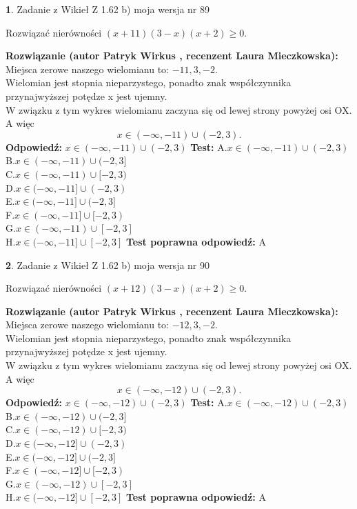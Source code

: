 \documentclass[12pt, a4paper]{article}
\theoremstyle{definition} %
\newtheorem{zad}{}
\newcommand{\zadStart}[1]{\begin{zad}#1\newline}
\newcommand{\zadStop}{\end{zad}}
\newcommand{\rozwStart}[2]{\noindent \textbf{Rozwiązanie (autor #1 , recenzent #2): }\newline}
\newcommand{\rozwStop}{\newline}
\newcommand{\odpStart}{\noindent \textbf{Odpowiedź:}\newline}
\newcommand{\odpStop}{\newline}
\newcommand{\testStart}{\noindent \textbf{Test:}\newline}
\newcommand{\testStop}{\newline}
\newcommand{\kluczStart}{\noindent \textbf{Test poprawna odpowiedź:}\newline}
\newcommand{\kluczStop}{\newline}
\begin{document}
\zadStart{Zadanie z Wikieł Z 1.62 b) moja wersja nr 89}

Rozwiązać nierówności $(x+11)(3-x)(x+2)\ge0$.
\zadStop
\rozwStart{Patryk Wirkus}{Laura Mieczkowska}
Miejsca zerowe naszego wielomianu to: $-11, 3, -2$.\\
Wielomian jest stopnia nieparzystego, ponadto znak współczynnika przy\linebreak najwyższej potędze x jest ujemny.\\ W związku z tym wykres wielomianu zaczyna się od lewej strony powyżej osi OX. A więc $$x \in (-\infty,-11) \cup (-2,3).$$
\rozwStop
\odpStart
$x \in (-\infty,-11) \cup (-2,3)$
\odpStop
\testStart
A.$x \in (-\infty,-11) \cup (-2,3)$\\
B.$x \in (-\infty,-11) \cup (-2,3]$\\
C.$x \in (-\infty,-11) \cup [-2,3)$\\
D.$x \in (-\infty,-11] \cup (-2,3)$\\
E.$x \in (-\infty,-11] \cup (-2,3]$\\
F.$x \in (-\infty,-11] \cup [-2,3)$\\
G.$x \in (-\infty,-11) \cup [-2,3]$\\
H.$x \in (-\infty,-11] \cup [-2,3]$
\testStop
\kluczStart
A
\kluczStop



\zadStart{Zadanie z Wikieł Z 1.62 b) moja wersja nr 90}

Rozwiązać nierówności $(x+12)(3-x)(x+2)\ge0$.
\zadStop
\rozwStart{Patryk Wirkus}{Laura Mieczkowska}
Miejsca zerowe naszego wielomianu to: $-12, 3, -2$.\\
Wielomian jest stopnia nieparzystego, ponadto znak współczynnika przy\linebreak najwyższej potędze x jest ujemny.\\ W związku z tym wykres wielomianu zaczyna się od lewej strony powyżej osi OX. A więc $$x \in (-\infty,-12) \cup (-2,3).$$
\rozwStop
\odpStart
$x \in (-\infty,-12) \cup (-2,3)$
\odpStop
\testStart
A.$x \in (-\infty,-12) \cup (-2,3)$\\
B.$x \in (-\infty,-12) \cup (-2,3]$\\
C.$x \in (-\infty,-12) \cup [-2,3)$\\
D.$x \in (-\infty,-12] \cup (-2,3)$\\
E.$x \in (-\infty,-12] \cup (-2,3]$\\
F.$x \in (-\infty,-12] \cup [-2,3)$\\
G.$x \in (-\infty,-12) \cup [-2,3]$\\
H.$x \in (-\infty,-12] \cup [-2,3]$
\testStop
\kluczStart
A
\kluczStop
\end{document}

